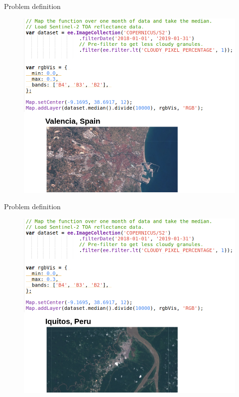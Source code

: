 \begin{frame}{Problem definition}
	\begin{center}
		\begin{figure}
			\includegraphics[width=0.76\linewidth]{images/problematic_01.png}
		\end{figure}
	\end{center}
\end{frame}


\begin{frame}{Problem definition}
	\begin{center}
		\begin{figure}
			\includegraphics[width=0.76\linewidth]{images/problematic_02.png}
		\end{figure}
	\end{center}
\end{frame}


